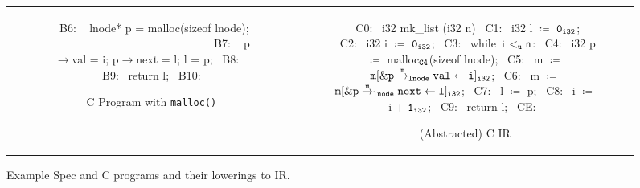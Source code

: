 \begin{figure}[t]
\begin{tabular}{cc}
\begin{subfigure}[b]{0.59\textwidth}
\begin{center}
\begin{allLangEnvScript}
{{~{\tiny \textcolor{mygray}{B6: }}~     lnode* p = malloc(sizeof lnode);                      $\phantom{m \coloneq \mathrm{\tt m[\&\structPointer{\tt p}{m}{\tt lnode}{val} \leftarrow l]_{i32}};}$
~{\tiny \textcolor{mygray}{B7: }}~     p$\rightarrow$val = i; p$\rightarrow$next = l; l = p;
~{\tiny \textcolor{mygray}{B8: }}~   }
~{\tiny \textcolor{mygray}{B9:}}~   return l;
~{\tiny \textcolor{mygray}{B10:}}~ }
\end{allLangEnvScript}
\end{center}
\caption{\label{fig:llAllocC}C Program with {\tt malloc()}}
\end{subfigure}%
&
\begin{subfigure}[b]{0.41\textwidth}
\begin{center}
\begin{allLangEnvScript}
~{\tiny \textcolor{mygray}{C0:}}~ i32 mk_list (i32 n) {
~{\tiny \textcolor{mygray}{C1:}}~   i32 l $\coloneq$ ${\tt 0_{i32}}$;
~{\tiny \textcolor{mygray}{C2:}}~   i32 i $\coloneq$ ${\tt 0_{i32}}$;
~{\tiny \textcolor{mygray}{C3:}}~   while ${\tt i <_{u} n}$:
~{\tiny \textcolor{mygray}{C4:}}~     i32 p $\coloneq$ malloc$_{\tt C4}$(sizeof lnode);
~{\tiny \textcolor{mygray}{C5:}}~     m $\coloneq$ $\mathrm{\tt m[\&{\tt \tt p} \overset{m}{\rightarrow}_{\tt lnode} {\tt val} \leftarrow i]_{i32}}$;
~{\tiny \textcolor{mygray}{C6:}}~     m $\coloneq$ $\mathrm{\tt m[\&{\tt \tt p} \overset{m}{\rightarrow}_{\tt lnode} {\tt next} \leftarrow l]_{i32}}$;
~{\tiny \textcolor{mygray}{C7:}}~     l $\coloneq$ p;
~{\tiny \textcolor{mygray}{C8:}}~     i $\coloneq$ i + ${\tt 1_{i32}}$;
~{\tiny \textcolor{mygray}{C9:}}~   return l;
~{\tiny \textcolor{mygray}{CE:}}~ }
\end{allLangEnvScript}
\end{center}
\caption{\label{fig:llAllocCIR}(Abstracted) C IR}
\end{subfigure}%
\\
\end{tabular}
\caption{\label{fig:llAllocSpecAndC}Example Spec and C programs and their lowerings to IR.}
\end{figure}
